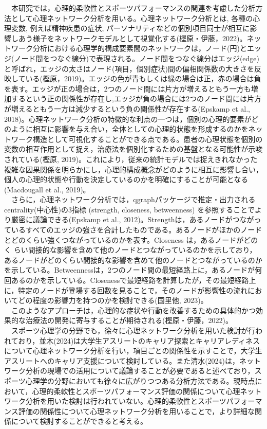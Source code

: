 \documentclass[12pt,a4paper,xelatex,ja=standard]{bxjsarticle}
\begin{document}
　本研究では，心理的柔軟性とスポーツパフォーマンスの関連を考慮した分析方法として心理ネットワーク分析を用いる。心理ネットワーク分析とは,
各種の心理変数, 例えば精神疾患の症状,
パーソナリティなどの個別項目同士が相互に影響しあう様子をネットワークモデルとして視覚化する(樫原・伊藤，2022)。ネットワーク分析における心理学的構成要素間のネットワークは，ノード(円)とエッジ(ノード間をつなぐ線分)で表現される。ノード間をつなぐ線分はエッジ(edge)と呼ばれ，エッジの太さはノード(項目，個別症状)間の偏相関係数の大きさを反映している(樫原，2019)。エッジの色が青もしくは緑の場合は正，赤の場合は負を表す。エッジが正の場合は，2つのノード間には片方が増えるともう一方も増加するという正の関係性が存在し,エッジが負の場合には2つのノード間には片方が増えるともう一方は減少するという負の関係性が存在する(Epskamp
et al.,
2018)。心理ネットワーク分析の特徴的な利点の一つは，個別の心理的要素がどのように相互に影響を与え合い，全体としての心理的状態を形成するのかをネットワーク構造として可視化することができる点である。患者の心理状態を個別の変数の相互作用として捉え，治療法を個別化するための基盤となる可能性が示唆されている(樫原,
2019)。これにより，従来の統計モデルでは捉えきれなかった複雑な因果関係を明らかにし，心理的構成概念がどのように相互に影響し合い，個人の心理的状態や行動を決定しているのかを明確にすることが可能となる(Macdougall
et al., 2019)。\\
　さらに，心理ネットワーク分析では，qgraphパッケージで推定・出力されるcentrality(中心性)の3指標
(strength, closeness, betweenness)
を参照することでより厳密に議論できる(Epskamp et al.,
2012)。Strengthは，あるノードがつながっているすべてのエッジの強さを合計したものである。あるノードがほかのノードとどのくらい強くつながっているのかを表す。Closeness
は，あるノードがどのく
らい間接的な影響を含めて他のノードとつながっているのかを示しており，あるノードがどのくらい間接的な影響を含めて他のノードとつながっているのかを示している。Betweennessは，2つのノード間の最短経路上に，あるノードが何回あるのかを示している。Closenessで最短経路を計算したが，その最短経路上に，特定のノードが登場する回数を見ることで，そのノードが影響性の流れにおいてどの程度の影響力を持つのかを検討できる(国里他,
2023)。\\
　このようなアプローチは，心理的な症状や行動を改善するための具体的かつ効果的な治療法の開発に寄与することが期待される(樫原・伊藤，2022)。\\
　スポーツ心理学の分野でも，徐々に心理ネットワーク分析を用いた検討が行われており，並木(2024)は大学生アスリートのキャリア探索とキャリアレディネスについて心理ネットワーク分析を行い，項目ごとの関係性を示すことで，大学生アスリートへのキャリア支援について検討している。また清水(2024)は，ネットワーク分析の現場での活用について議論することが必要であると述べており，スポーツ心理学の分野においても徐々に広がりつつある分析方法である。現時点において，心理的柔軟性とスポーツパフォーマンス評価の関係について心理ネットワーク分析を用いた検討は行われていない。心理的柔軟性とスポーツパフォーマンス評価の関係性について心理ネットワーク分析を用いることで，より詳細な関係について検討することができると考える。
\end{document}
